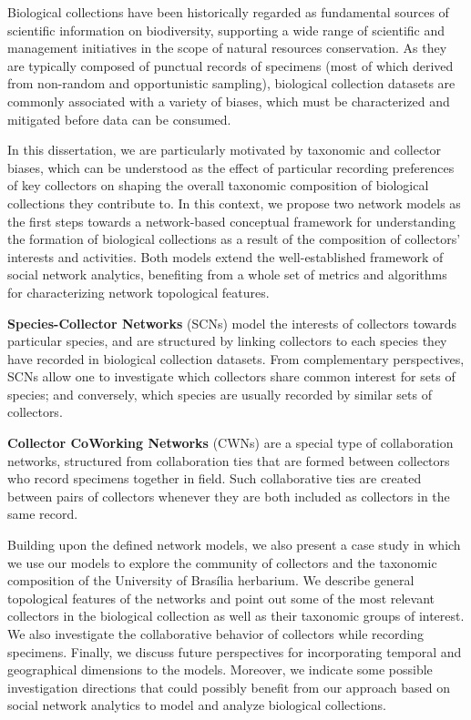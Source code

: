 \documentclass[
	12pt,				%
	openright,			%
	oneside,			%
	a4paper,			%
	sumario=tradicional,%
	french,				%
	spanish,			%
	brazil,				%
    english
	]{abntex2}
\begin{document}
\setlength{\absparsep}{18pt} %
\begin{resumo}
\begin{small}
Biological collections have been historically regarded as fundamental sources of scientific information on biodiversity, supporting a wide range of scientific and management initiatives in the scope of natural resources conservation. As they are typically composed of punctual records of specimens (most of which derived from non-random and opportunistic sampling), biological collection datasets are commonly associated with a variety of biases, which must be characterized and mitigated before data can be consumed.

In this dissertation, we are particularly motivated by taxonomic and collector biases, which can be understood as the effect of particular recording preferences of key collectors on shaping the overall taxonomic composition of biological collections they contribute to. In this context, we propose two network models as the first steps towards a network-based conceptual framework for understanding the formation of biological collections as a result of the composition of collectors' interests and activities. Both models extend the well-established framework of social network analytics, benefiting from a whole set of metrics and algorithms for characterizing network topological features.

\textbf{Species-Collector Networks} (SCNs) model the interests of collectors towards particular species, and are structured by linking collectors to each species they have recorded in biological collection datasets. From complementary perspectives, SCNs allow one to investigate which collectors share common interest for sets of species; and conversely, which species are usually recorded by similar sets of collectors.

\textbf{Collector CoWorking Networks} (CWNs) are a special type of collaboration networks, structured from collaboration ties  that are formed between collectors who record specimens together in field. Such collaborative ties are created between pairs of collectors whenever they are both included as collectors in the same record.

Building upon the defined network models, we also present a case study in which we use our models to explore the community of collectors and the taxonomic composition of the University of Brasília herbarium. We describe general topological features of the networks and point out some of the most relevant collectors in the biological collection as well as their taxonomic groups of interest. We also investigate the collaborative behavior of collectors while recording specimens.
Finally, we discuss future perspectives for incorporating temporal and geographical dimensions to the models. 
Moreover, we indicate some possible investigation directions that could possibly benefit from our approach based on social network analytics to model and analyze biological collections.


\end{small}
\end{resumo}
\end{document}
